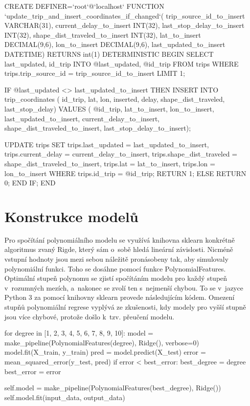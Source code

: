 \begin{code}[frame=none]
CREATE DEFINER=`root`@`localhost` FUNCTION
  `update_trip_and_insert_coordinates_if_changed`(
  trip_source_id_to_insert VARCHAR(31),
  current_delay_to_insert INT(32),
    last_stop_delay_to_insert INT(32),
  shape_dist_traveled_to_insert INT(32),
  lat_to_insert DECIMAL(9,6),
  lon_to_insert DECIMAL(9,6),
  last_updated_to_insert DATETIME) RETURNS int(1)
    DETERMINISTIC
BEGIN
  SELECT last_updated, id_trip
  INTO @last_updated, @id_trip
  FROM trips
  WHERE trips.trip_source_id = trip_source_id_to_insert
  LIMIT 1;


  IF @last_updated <> last_updated_to_insert THEN
    INSERT INTO trip_coordinates (
      id_trip,
      lat,
      lon,
      inserted,
      delay,
      shape_dist_traveled,
      last_stop_delay)
    VALUES (
      @id_trip,
      lat_to_insert,
      lon_to_insert,
      last_updated_to_insert,
      current_delay_to_insert,
      shape_dist_traveled_to_insert,
      last_stop_delay_to_insert);


    UPDATE trips
    SET trips.last_updated = last_updated_to_insert,
      trips.current_delay = current_delay_to_insert,
      trips.shape_dist_traveled = shape_dist_traveled_to_insert,
      trips.lat = lat_to_insert,
      trips.lon = lon_to_insert
    WHERE trips.id_trip = @id_trip;
        RETURN 1;
  ELSE
    RETURN 0;
  END IF;
END
\end{code}




\section{Konstrukce modelů} \label{section:konstrukce_modelu}


Pro spočítání polynomiálního modelu se využívá knihovna sklearn konkrétně algoritmus zvaný Rigde, který sám o~sobě hledá lineární závislosti. Nicméně vstupní hodnoty jsou mezi sebou náležitě pronásobeny tak, aby simulovaly polynomiální funkci. Toho se dosáhne pomocí funkce PolynomialFeatures. Optimální stupeň polynomu se zjistí spočítáním modelu pro každý stupeň v~rozumných mezích, a~nakonec se zvolí ten s~nejmenší chybou. To se v~jazyce Python 3 za pomocí knihovny sklearn provede následujícím kódem. Omezení stupňů polynomiální regrese vyplývá ze zkušenosti, kdy modely pro vyšší stupně jsou více chybové, protože došlo k~tzv. přeučení modelu.


\begin{code}[frame=none]
for degree in [1, 2, 3, 4, 5, 6, 7, 8, 9, 10]:
  model = make_pipeline(PolynomialFeatures(degree), Ridge(), verbose=0)
  model.fit(X_train, y_train)
  pred = model.predict(X_test)
  error = mean_squared_error(y_test, pred)
  if error < best_error:
    best_degree = degree
    best_error = error


self.model = make_pipeline(PolynomialFeatures(best_degree), Ridge())
self.model.fit(input_data, output_data)
\end{code}

